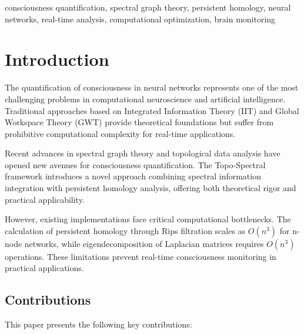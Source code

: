 \documentclass[conference]{IEEEtran}
\begin{document}
\begin{IEEEkeywords}
consciousness quantification, spectral graph theory, persistent homology, neural networks, real-time analysis, computational optimization, brain monitoring
\end{IEEEkeywords}

\section{Introduction}

The quantification of consciousness in neural networks represents one of the most challenging problems in computational neuroscience and artificial intelligence. Traditional approaches based on Integrated Information Theory (IIT) \cite{Tononi2016} and Global Workspace Theory (GWT) \cite{Baars1988} provide theoretical foundations but suffer from prohibitive computational complexity for real-time applications.

Recent advances in spectral graph theory and topological data analysis have opened new avenues for consciousness quantification. The Topo-Spectral framework \cite{Molina2024} introduces a novel approach combining spectral information integration with persistent homology analysis, offering both theoretical rigor and practical applicability.

However, existing implementations face critical computational bottlenecks. The calculation of persistent homology through Rips filtration scales as $O(n^3)$ for n-node networks, while eigendecomposition of Laplacian matrices requires $O(n^3)$ operations. These limitations prevent real-time consciousness monitoring in practical applications.

\subsection{Contributions}

This paper presents the following key contributions:
\end{document}
